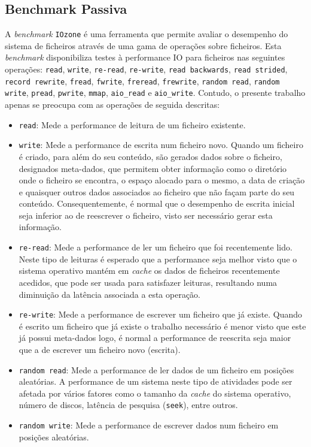 \documentclass{article}
\begin{document}
\subsection{Benchmark Passiva}
A \textit{benchmark} \texttt{IOzone} é uma ferramenta que permite avaliar o desempenho do sistema de ficheiros através de uma gama de 
operações sobre ficheiros. Esta \textit{benchmark} disponibiliza testes à performance IO para ficheiros nas seguintes operações: \texttt{read}, 
\texttt{write}, \texttt{re-read}, \texttt{re-write}, \texttt{read backwards}, \texttt{read strided}, \texttt{record rewrite}, \texttt{fread}, 
\texttt{fwrite}, \texttt{freread}, \texttt{frewrite}, \texttt{random read}, \texttt{random write}, \texttt{pread}, \texttt{pwrite}, \texttt{mmap}, 
\texttt{aio\_read} e \texttt{aio\_write}. Contudo, o presente trabalho apenas se preocupa com as operações de seguida descritas:
\label{iozone_ops}
\begin{itemize}
    \item \texttt{read}: Mede a performance de leitura de um ficheiro existente.
    \item \texttt{write}: Mede a performance de escrita num ficheiro novo. Quando um ficheiro é criado, para além do seu conteúdo, são gerados 
    dados sobre o ficheiro, designados meta-dados, que permitem obter informação como o diretório onde o ficheiro se encontra, o espaço 
    alocado para o mesmo, a data de criação e quaisquer outros dados associados ao ficheiro que não façam parte do seu conteúdo. Consequentemente, 
    é normal que o desempenho de escrita inicial seja inferior ao de reescrever o ficheiro, visto ser necessário gerar esta informação.
    \item \texttt{re-read}: Mede a performance de ler um ficheiro que foi recentemente lido. Neste tipo de leituras é esperado que a performance 
    seja melhor visto que o sistema operativo mantém em \textit{cache} os dados de ficheiros recentemente acedidos, que pode ser usada para 
    satisfazer leituras, resultando numa diminuição da latência associada a esta operação.
    \item \texttt{re-write}: Mede a performance de escrever um ficheiro que já existe. Quando é escrito um ficheiro que já existe o trabalho necessário 
    é menor visto que este já possui meta-dados logo, é normal a performance de reescrita seja maior que a de escrever um ficheiro novo (escrita).
    \item \texttt{random read}: Mede a performance de ler dados de um ficheiro em posições aleatórias. A performance de um sistema neste tipo de atividades 
    pode ser afetada por vários fatores como o tamanho da \textit{cache} do sistema operativo, número de discos, latência de pesquisa (\texttt{seek}), 
    entre outros.
    \item \texttt{random write}: Mede a performance de escrever dados num ficheiro em posições aleatórias.
\end{itemize}
\end{document}
